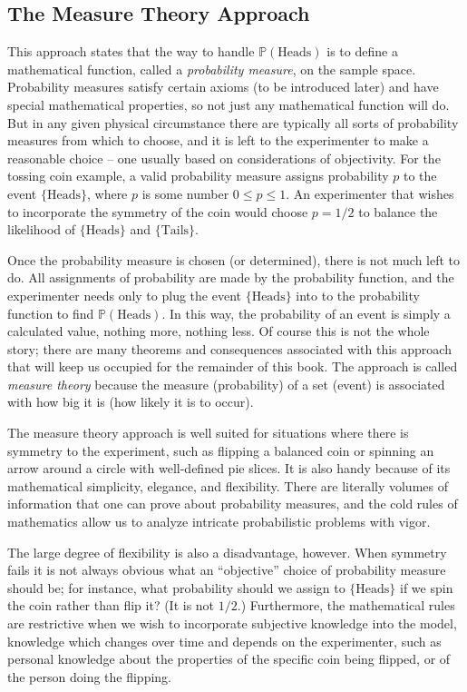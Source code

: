 \documentclass[]{book}
\numberwithin{equation}{chapter}
\numberwithin{figure}{chapter}
\theoremstyle{plain}
\theoremstyle{definition}
\theoremstyle{remark}
\theoremstyle{definition}
\theoremstyle{definition}
\theoremstyle{remark}
\begin{document}
\subsection{The Measure Theory
Approach}\label{the-measure-theory-approach}

This approach states that the way to handle \(\mathbb{P}(\mbox{Heads})\)
is to define a mathematical function, called a \emph{probability
measure}, on the sample space. Probability measures satisfy certain
axioms (to be introduced later) and have special mathematical
properties, so not just any mathematical function will do. But in any
given physical circumstance there are typically all sorts of probability
measures from which to choose, and it is left to the experimenter to
make a reasonable choice -- one usually based on considerations of
objectivity. For the tossing coin example, a valid probability measure
assigns probability \(p\) to the event \(\{ \mbox{Heads} \}\), where
\(p\) is some number \(0\leq p\leq1\). An experimenter that wishes to
incorporate the symmetry of the coin would choose \(p=1/2\) to balance
the likelihood of \(\{\mbox{Heads} \}\) and \(\{ \mbox{Tails} \}\).

Once the probability measure is chosen (or determined), there is not
much left to do. All assignments of probability are made by the
probability function, and the experimenter needs only to plug the event
\(\{ \mbox{Heads} \}\) into to the probability function to find
\(\mathbb{P}(\mbox{Heads})\). In this way, the probability of an event
is simply a calculated value, nothing more, nothing less. Of course this
is not the whole story; there are many theorems and consequences
associated with this approach that will keep us occupied for the
remainder of this book. The approach is called \emph{measure theory}
because the measure (probability) of a set (event) is associated with
how big it is (how likely it is to occur).

The measure theory approach is well suited for situations where there is
symmetry to the experiment, such as flipping a balanced coin or spinning
an arrow around a circle with well-defined pie slices. It is also handy
because of its mathematical simplicity, elegance, and flexibility. There
are literally volumes of information that one can prove about
probability measures, and the cold rules of mathematics allow us to
analyze intricate probabilistic problems with vigor.

The large degree of flexibility is also a disadvantage, however. When
symmetry fails it is not always obvious what an ``objective'' choice of
probability measure should be; for instance, what probability should we
assign to \(\{ \mbox{Heads} \}\) if we spin the coin rather than flip
it? (It is not \(1/2\).) Furthermore, the mathematical rules are
restrictive when we wish to incorporate subjective knowledge into the
model, knowledge which changes over time and depends on the
experimenter, such as personal knowledge about the properties of the
specific coin being flipped, or of the person doing the flipping.
\end{document}
